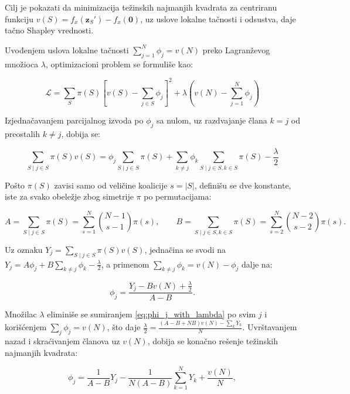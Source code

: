 Cilj je pokazati da minimizacija težinskih najmanjih kvadrata za centriranu funkciju $v(S) = f_x(\mathbf{z}_S') - f_x(\mathbf{0})$, uz uslove lokalne tačnosti i odsustva, daje tačno Shapley vrednosti.

Uvođenjem uslova lokalne tačnosti $\sum_{j=1}^N \phi_j = v(N)$ preko Lagranževog množioca $\lambda$, optimizacioni problem se formuliše kao:

\begin{equation}
    \mathcal{L} = \sum_{S} \pi(S) \left[ v(S) - \sum_{j \in S} \phi_j \right]^2 + \lambda \left( v(N) - \sum_{j=1}^N \phi_j \right)
\end{equation}

Izjednačavanjem parcijalnog izvoda po $\phi_j$ sa nulom, uz razdvajanje člana $k=j$ od preostalih $k \neq j$, dobija se:

\begin{equation*}
    \sum_{S \mid j \in S} \pi(S) v(S) = \phi_j \sum_{S \mid j \in S} \pi(S) + \sum_{k \neq j} \phi_k \sum_{S \mid j \in S, k \in S} \pi(S) - \frac{\lambda}{2}
\end{equation*}

Pošto $\pi(S)$ zavisi samo od veličine koalicije $s=|S|$, definišu se dve konstante, iste za svako obeležje zbog simetrije $\pi$ po permutacijama:

\begin{equation*}
    A = \sum_{S \mid j \in S} \pi(S) = \sum_{s=1}^{N} \binom{N-1}{s-1}\pi(s), \qquad
    B = \sum_{S \mid j \in S, k \in S} \pi(S) = \sum_{s=2}^{N} \binom{N-2}{s-2}\pi(s).
\end{equation*}

Uz oznaku $Y_j = \sum_{S \mid j \in S} \pi(S) v(S)$, jednačina se svodi na $Y_j = A\phi_j + B\sum_{k\neq j}\phi_k - \frac{\lambda}{2}$, a primenom $\sum_{k \neq j}\phi_k = v(N) - \phi_j$ dalje na:

\begin{equation}
    \phi_j = \frac{Y_j - Bv(N) + \frac{\lambda}{2}}{A-B}. \label{eq:phi_j_with_lambda}
\end{equation}

Množilac $\lambda$ eliminiše se sumiranjem \eqref{eq:phi_j_with_lambda} po svim $j$ i korišćenjem $\sum_j \phi_j = v(N)$, što daje $\frac{\lambda}{2} = \frac{(A-B+NB)v(N) - \sum_k Y_k}{N}$. Uvrštavanjem nazad i skraćivanjem članova uz $v(N)$, dobija se konačno rešenje težinskih najmanjih kvadrata:

\begin{equation}
    \phi_j = \frac{1}{A-B}Y_j - \frac{1}{N(A-B)}\sum_{k=1}^N Y_k + \frac{v(N)}{N}, \label{eq:wls_clean_solution}
\end{equation}

